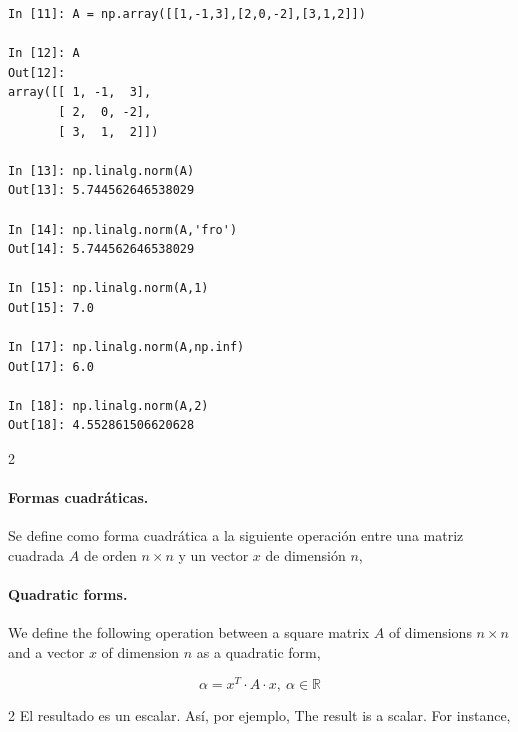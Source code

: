 \begin{center}
    \begin{minipage}{0.5\textwidth}
    \begin{verbatim}
In [11]: A = np.array([[1,-1,3],[2,0,-2],[3,1,2]])

In [12]: A
Out[12]: 
array([[ 1, -1,  3],
       [ 2,  0, -2],
       [ 3,  1,  2]])

In [13]: np.linalg.norm(A)
Out[13]: 5.744562646538029

In [14]: np.linalg.norm(A,'fro')
Out[14]: 5.744562646538029

In [15]: np.linalg.norm(A,1)
Out[15]: 7.0

In [17]: np.linalg.norm(A,np.inf)
Out[17]: 6.0

In [18]: np.linalg.norm(A,2)
Out[18]: 4.552861506620628
\end{verbatim}
\end{minipage}
\end{center}

\begin{paracol}{2}
\paragraph{Formas cuadráticas.} Se define como forma cuadrática a la siguiente operación entre una matriz cuadrada $A$ de orden $n \times n$ y un vector $x$ de dimensión $n$,
\switchcolumn
\paragraph{Quadratic forms.} We define the following operation between a square matrix $A$ of dimensions $n\times n$ and a vector $x$ of dimension $n$ as a quadratic form,
\end{paracol}
\begin{equation*}
\alpha=x^T\cdot A \cdot x, \ \alpha \in \mathbb{R}
\end{equation*}

\begin{paracol}{2}
El resultado es un escalar. Así, por ejemplo,
\switchcolumn
The result is a scalar. For instance,
\end{paracol}

